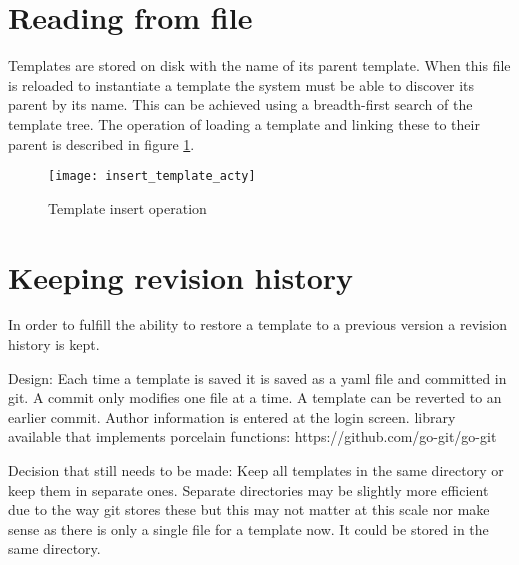 \section{Reading from file}
Templates are stored on disk with the name of its parent template.
When this file is reloaded to instantiate a template the system must be able to discover its
parent by its name. This can be achieved using a breadth-first search of the template tree.
The operation of loading a template and linking these to their parent is described in figure \ref{fig:inserttemplate}.

\begin{figure}[h!]
	\centering
	\texttt{[image: insert\_template\_acty]}
	\caption{Template insert operation}
	\label{fig:inserttemplate}
\end{figure}

\section{Keeping revision history}
In order to fulfill the ability to restore a template to a previous version a revision history is kept.


Design:
Each time a template is saved it is saved as a yaml file and committed in git.
A commit only modifies one file at a time.
A template can be reverted to an earlier commit.
Author information is entered at the login screen.
library available that implements porcelain functions:
https://github.com/go-git/go-git

Decision that still needs to be made:
Keep all templates in the same directory or keep them in separate ones.
Separate directories may be slightly more efficient due to the way git stores these but this may not matter at this scale nor make sense as there is only a single file for a template now.
It could be stored in the same directory.

